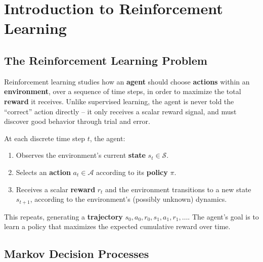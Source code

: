 \documentclass[12pt,a4paper]{article}
\begin{document}
\newpage

\section{Introduction to Reinforcement Learning}

\subsection{The Reinforcement Learning Problem}

Reinforcement learning studies how an \textbf{agent} should choose \textbf{actions} within an \textbf{environment}, over a sequence of time steps, in order to maximize the total \textbf{reward} it receives. Unlike supervised learning, the agent is never told the ``correct'' action directly -- it only receives a scalar reward signal, and must discover good behavior through trial and error.

\begin{defbox}
At each discrete time step $t$, the agent:
\begin{enumerate}[leftmargin=1.5em]
    \item Observes the environment's current \textbf{state} $s_t \in \mathcal{S}$.
    \item Selects an \textbf{action} $a_t \in \mathcal{A}$ according to its \textbf{policy} $\pi$.
    \item Receives a scalar \textbf{reward} $r_t$ and the environment transitions to a new state $s_{t+1}$, according to the environment's (possibly unknown) dynamics.
\end{enumerate}
This repeats, generating a \textbf{trajectory} $s_0, a_0, r_0, s_1, a_1, r_1, \ldots$. The agent's goal is to learn a policy that maximizes the expected cumulative reward over time.
\end{defbox}

\subsection{Markov Decision Processes}

\end{document}
